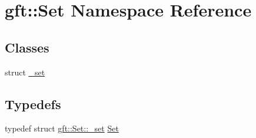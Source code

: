 \hypertarget{namespacegft_1_1Set}{\section{gft\-:\-:Set Namespace Reference}
\label{namespacegft_1_1Set}
}
\subsection*{Classes}
\begin{DoxyCompactItemize}
\item 
struct \hyperlink{structgft_1_1Set_1_1__set}{\-\_\-set}
\end{DoxyCompactItemize}
\subsection*{Typedefs}
\begin{DoxyCompactItemize}
\item 
typedef struct \hyperlink{structgft_1_1Set_1_1__set}{gft\-::\-Set\-::\-\_\-set} \hyperlink{namespacegft_1_1Set_a82cadd31ebabd3c72c7f099c4980f45b}{Set}
\end{DoxyCompactItemize}

